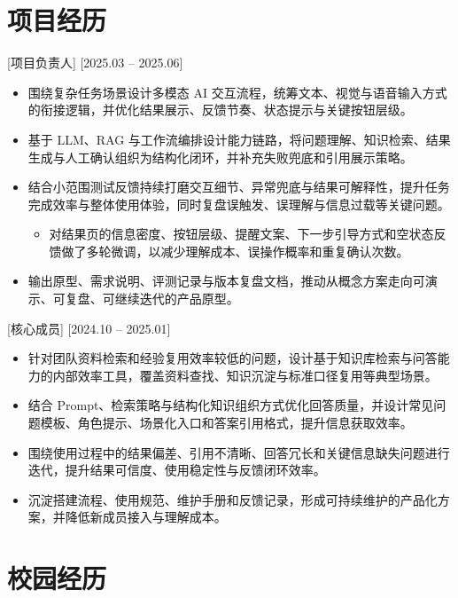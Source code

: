 \documentclass{resume}
\begin{document}
\section{项目经历}

  [项目负责人]
  [2025.03 -- 2025.06]

\begin{itemize}
  \item 围绕复杂任务场景设计多模态 AI 交互流程，统筹文本、视觉与语音输入方式的衔接逻辑，并优化结果展示、反馈节奏、状态提示与关键按钮层级。
  \item 基于 LLM、RAG 与工作流编排设计能力链路，将问题理解、知识检索、结果生成与人工确认组织为结构化闭环，并补充失败兜底和引用展示策略。
  \item 结合小范围测试反馈持续打磨交互细节、异常兜底与结果可解释性，提升任务完成效率与整体使用体验，同时复盘误触发、误理解与信息过载等关键问题。
    \begin{itemize}
      \item 对结果页的信息密度、按钮层级、提醒文案、下一步引导方式和空状态反馈做了多轮微调，以减少理解成本、误操作概率和重复确认次数。
    \end{itemize}
  \item 输出原型、需求说明、评测记录与版本复盘文档，推动从概念方案走向可演示、可复盘、可继续迭代的产品原型。
\end{itemize}

  [核心成员]
  [2024.10 -- 2025.01]

\begin{itemize}
  \item 针对团队资料检索和经验复用效率较低的问题，设计基于知识库检索与问答能力的内部效率工具，覆盖资料查找、知识沉淀与标准口径复用等典型场景。
  \item 结合 Prompt、检索策略与结构化知识组织方式优化回答质量，并设计常见问题模板、角色提示、场景化入口和答案引用格式，提升信息获取效率。
  \item 围绕使用过程中的结果偏差、引用不清晰、回答冗长和关键信息缺失问题进行迭代，提升结果可信度、使用稳定性与反馈闭环效率。
  \item 沉淀搭建流程、使用规范、维护手册和反馈记录，形成可持续维护的产品化方案，并降低新成员接入与理解成本。
\end{itemize}
\section{校园经历}
\end{document}
